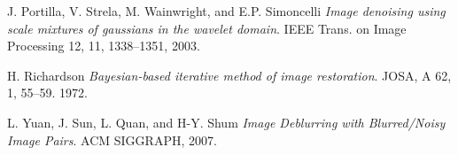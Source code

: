 \documentclass{article}
\begin{document}
\begin{thebibliography}{9}

	J. Portilla, V. Strela, M. Wainwright, and E.P. Simoncelli
	\emph{Image denoising using scale mixtures of gaussians in the wavelet domain}.
	IEEE
	Trans. on Image Processing 12, 11, 1338–1351,
	2003.

	H. Richardson
	\emph{ Bayesian-based iterative method of image restoration}.
	JOSA, A 62, 1, 55–59.
	1972.

	L. Yuan, J. Sun, L. Quan, and H-Y. Shum
	\emph{Image Deblurring with Blurred/Noisy Image Pairs}.
	ACM SIGGRAPH,
	2007. 

\end{thebibliography}
\end{document}
